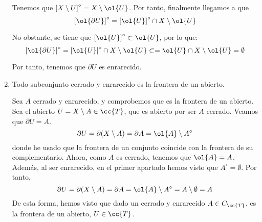 \begin{ejercicio}
\begin{enumerate}
        Tenemos que $\left[X\setminus U\right]^\circ=X\setminus \ol{U}$. Por tanto, finalmente llegamos a que 
        $$\left[\ol{\partial U}\right]^\circ
            = \left[\ol{U}\right]^\circ\cap X\setminus\ol{U}
        $$

        No obstante, se tiene que $\left[\ol{U}\right]^\circ\subset \ol{U}$, por lo que:
        $$\left[\ol{\partial U}\right]^\circ
            = \left[\ol{U}\right]^\circ\cap X\setminus\ol{U}
            \subset 
            = \ol{U} \cap X\setminus\ol{U} = \emptyset
        $$

        Por tanto, tenemos que $\partial U$ es enrarecido.
        
        \item Todo subconjunto cerrado y enrarecido es la frontera de un abierto.

        Sea $A$ cerrado y enrarecido, y comprobemos que es la frontera de un abierto. Sea el abierto $U=X\setminus A\in \cc{T}$, que es abierto por ser $A$ cerrado. Veamos que $\partial U=A$.
        \begin{equation*}
            \partial U = \partial (X\setminus A) = \partial A = \ol{A}\setminus A^\circ
        \end{equation*}
        donde he usado que la frontera de un conjunto coincide con la frontera de su complementario. Ahora, como $A$ es cerrado, tenemos que $\ol{A}=A$. Además, al ser enrarecido, en el primer apartado hemos visto que $A^\circ = \emptyset$. Por tanto, 
        \begin{equation*}
            \partial U = \partial (X\setminus A) = \partial A = \ol{A}\setminus A^\circ = A\setminus \emptyset = A
        \end{equation*}
        De esta forma, hemos visto que dado un cerrado y enrarecido $A\in C_\cc{T}$, es la frontera de un abierto, $U\in \cc{T}$.
    \end{enumerate}
\end{ejercicio}

